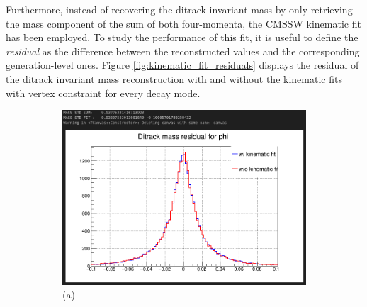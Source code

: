 \begin{myitemlist}
    Furthermore, instead of recovering the ditrack invariant mass by only retrieving the mass component of the sum of both four-momenta, the CMSSW kinematic fit has been employed. To study the performance of this fit, it is useful to define the \textit{residual} as the difference between the reconstructed values and the corresponding generation-level ones. Figure \ref{fig:kinematic_fit_residuals} displays the residual of the ditrack invariant mass reconstruction with and without the kinematic fits with vertex constraint for every decay mode.
    \begin{figure}[!ht]
        \captionsetup[subfigure]{labelformat=empty}
        \vspace*{-0.2cm}
        \centering
        \setlength{\mylength}{\textwidth}
        \begin{subfigure}[t]{0.50\mylength}
                \centering
                \includegraphics[width=0.45\mylength]{resources/plots/Phi3_kinematic_fit_residual.png}
                \caption{\footnotesize (a)}
        \end{subfigure}%
        \begin{subfigure}[t]{0.50\mylength}
                \centering

\end{subfigure}
\end{figure}
\end{myitemlist}
